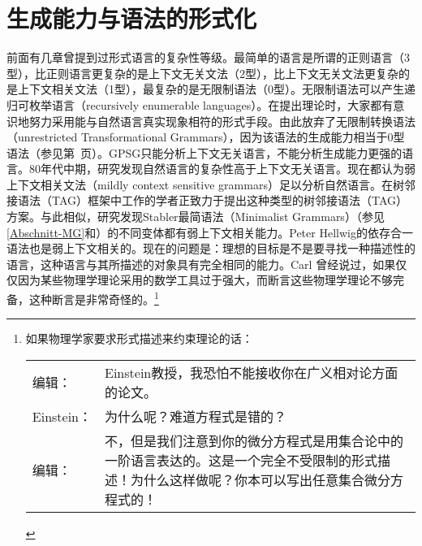 
\chapter{生成能力与语法的形式化}
\label{sec-generative-capacity}

前面有几章曾提到过形式语言的复杂性等级。最简单的语言是所谓的正则语言（3型），比正则语言更复杂的是上下文无关文法（2型），比上下文无关文法更复杂的是上下文相关文法（1型），最复杂的是无限制语法（0型）。无限制语法可以产生递归可枚举语言（recursively enumerable languages）。在提出理论时，大家都有意识地努力采用能与自然语言真实现象相符的形式手段。由此放弃了无限制转换语法（unrestricted Transformational Grammars），因为该语法的生成能力相当于0型语法（参见第~\pageref{page-TG-Typ0}页）。GPSG只能分析上下文无关语言，不能分析生成能力更强的语言。80年代中期，研究发现自然语言的复杂性高于上下文无关语言\citep{Shieber85a,Culy85a}。现在都认为弱上下文相关文法（mildly context sensitive grammars）足以分析自然语言。在树邻接语法\indextag （TAG）框架中工作的学者正致力于提出这种类型的树邻接语法\indextag （TAG）方案。与此相似，研究发现Stabler最简语法（Minimalist Grammars）\indexmg （参见\ref{Abschnitt-MG}和\citet{Stabler2001a,Stabler2010b}）的不同变体都有弱上下文相关能力\citep{Michaelis2001a-u}。Peter Hellwig的依存合一语法也是弱上下文相关的\citep[]{Hellwig2003a}。现在的问题是：理想的目标是不是要寻找一种描述性的语言，这种语言与其所描述的对象具有完全相同的能力。Carl  \citet{Pollard96a}曾经说过，如果仅仅因为某些物理学理论采用的数学工具过于强大，而断言这些物理学理论不够完备，这种断言是非常奇怪的。\footnote{%
如果物理学家要求形式描述来约束理论的话：\\
\begin{tabular}{@{}l@{~}p{10.8cm}}
编辑：     & Einstein教授，我恐怕不能接收你在广义相对论方面的论文。\\
Einstein： & 为什么呢？难道方程式是错的？\\
编辑：     & 不，但是我们注意到你的微分方程式是用集合论中的一阶语言表达的。这是一个完全不受限制的形式描述！为什么这样做呢？你本可以写出任意集合微分方程式的！ \citep{Pollard96a}
\end{tabular}
}
